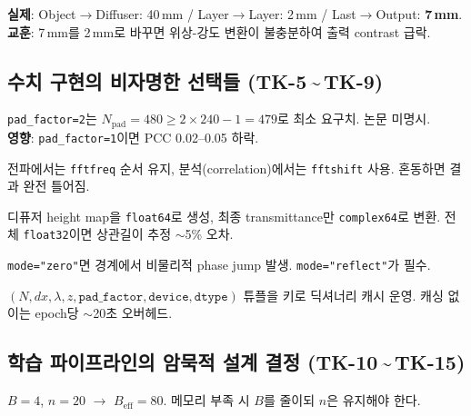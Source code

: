 \documentclass[11pt, a4paper]{article}
\begin{document}
\begin{tkbox}
\textbf{실제}: Object$\to$Diffuser: 40\,mm / Layer$\to$Layer: 2\,mm / Last$\to$Output: \textbf{7\,mm}.\\
\textbf{교훈}: 7\,mm를 2\,mm로 바꾸면 위상-강도 변환이 불충분하여 출력 contrast 급락.
\end{tkbox}

\subsection{수치 구현의 비자명한 선택들 (TK-5\,\textasciitilde\,TK-9)}

\begin{tkbox}
\texttt{pad\_factor=2}는 $N_\text{pad} = 480 \geq 2 \times 240 - 1 = 479$로 최소 요구치. 논문 미명시.\\
\textbf{영향}: \texttt{pad\_factor=1}이면 PCC 0.02--0.05 하락.
\end{tkbox}

\begin{tkbox}
전파에서는 \texttt{fftfreq} 순서 유지, 분석(correlation)에서는 \texttt{fftshift} 사용. 혼동하면 결과 완전 틀어짐.
\end{tkbox}

\begin{tkbox}
디퓨저 height map을 \texttt{float64}로 생성, 최종 transmittance만 \texttt{complex64}로 변환. 전체 \texttt{float32}이면 상관길이 추정 $\sim$5\% 오차.
\end{tkbox}

\begin{tkbox}
\texttt{mode="zero"}면 경계에서 비물리적 phase jump 발생. \texttt{mode="reflect"}가 필수.
\end{tkbox}

\begin{tkbox}
$(N, dx, \lambda, z, \texttt{pad\_factor}, \texttt{device}, \texttt{dtype})$ 튜플을 키로 딕셔너리 캐시 운영. 캐싱 없이는 epoch당 $\sim$20초 오버헤드.
\end{tkbox}

\subsection{학습 파이프라인의 암묵적 설계 결정 (TK-10\,\textasciitilde\,TK-15)}

\begin{tkbox}[TK-10. $B \times n$ 배치 확장]
$B = 4$, $n = 20$ $\to$ $B_\text{eff} = 80$. 메모리 부족 시 $B$를 줄이되 $n$은 유지해야 한다.
\end{tkbox}
\end{document}
